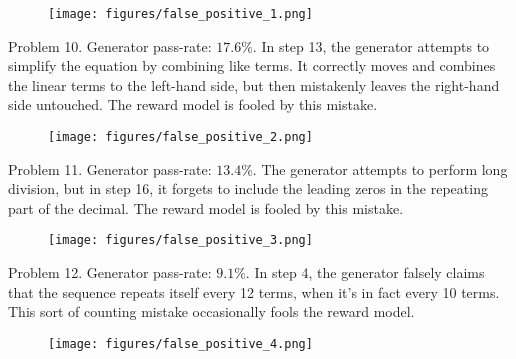 \documentclass{article}
\begin{document}
\vspace{.25cm}

\begin{figure}[!h]
\centering
\texttt{[image: figures/false\_positive\_1.png]}
\end{figure}

\newpage

Problem 10. Generator pass-rate: $17.6\%$. In step 13, the generator attempts to simplify the equation by combining like terms. It correctly moves and combines the linear terms to the left-hand side, but then mistakenly leaves the right-hand side untouched. The reward model is fooled by this mistake.

\vspace{.25cm}

\begin{figure}[!h]
\centering
\texttt{[image: figures/false\_positive\_2.png]}
\end{figure}

\vspace{.5cm}

Problem 11. Generator pass-rate: $13.4\%$. The generator attempts to perform long division, but in step 16, it forgets to include the leading zeros in the repeating part of the decimal. The reward model is fooled by this mistake.

\begin{figure}[!h]
\centering
\texttt{[image: figures/false\_positive\_3.png]}
\end{figure}

\newpage

Problem 12. Generator pass-rate: $9.1\%$. In step 4, the generator falsely claims that the sequence repeats itself every 12 terms, when it’s in fact every 10 terms. This sort of counting mistake occasionally fools the reward model.

\vspace{.25cm}

\begin{figure}[!h]
\centering
\texttt{[image: figures/false\_positive\_4.png]}
\end{figure}
\end{document}
